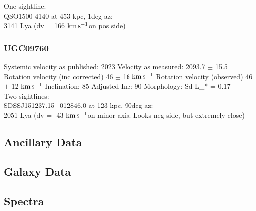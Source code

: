 \documentclass[iop]{emulateapj-rtx4}
\newcommand{\kms}{$\rm km\, s^{-1}$}
\begin{document}
One sightline: \\
QSO1500-4140 at 453 kpc, 1deg az: \\
3141 Lya (dv = 166 \kms on pos side)


\subsubsection{UGC09760}
Systemic velocity as published: 2023
Velocity as measured: 2093.7 $\pm$ 15.5
Rotation velocity (inc corrected) 46 $\pm$ 16 \kms
Rotation velocity (observed) 46 $\pm$ 12 \kms
Inclination: 85
Adjusted Inc: 90
Morphology: Sd
L_{\**} = 0.17 \\

Two sightlines: \\
SDSSJ151237.15+012846.0 at 123 kpc, 90deg az: \\
2051 Lya (dv = -43 \kms on minor axis. Looks neg side, but extremely close)



\subsection{Ancillary Data}


\subsection{Galaxy Data}







\subsection{Spectra}
\end{document}
